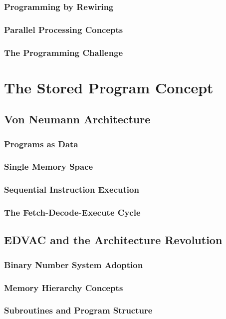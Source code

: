 \documentclass[12pt, oneside]{book}
\begin{document}
\subsubsection{Programming by Rewiring}
\subsubsection{Parallel Processing Concepts}
\subsubsection{The Programming Challenge}

\section{The Stored Program Concept}
\subsection{Von Neumann Architecture}
\subsubsection{Programs as Data}
\subsubsection{Single Memory Space}
\subsubsection{Sequential Instruction Execution}
\subsubsection{The Fetch-Decode-Execute Cycle}

\subsection{EDVAC and the Architecture Revolution}
\subsubsection{Binary Number System Adoption}
\subsubsection{Memory Hierarchy Concepts}
\subsubsection{Subroutines and Program Structure}
\end{document}
